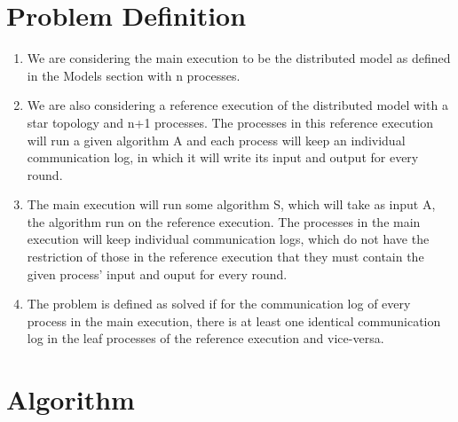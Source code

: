 \documentclass[english]{article}
\begin{document}
\section{Problem Definition}

\begin{enumerate}
\item We are considering the main execution to be the distributed model as defined in the Models section with n processes.

\item We are also considering a reference execution of the distributed model with a star topology and n+1 processes. The processes in this reference execution will run a given algorithm A and each process will keep an individual communication log, in which it will write its input and output for every round.

\item The main execution will run some algorithm S, which will take as input A, the algorithm run on the reference execution. The processes in the main execution will keep individual communication logs, which do not have the restriction of those in the reference execution that they must contain the given process' input and ouput for every round.

\item The problem is defined as solved if for the communication log of every process in the main execution, there is at least one identical communication log in the leaf processes of the reference execution and vice-versa.

\end{enumerate}

\section{Algorithm}
\end{document}
